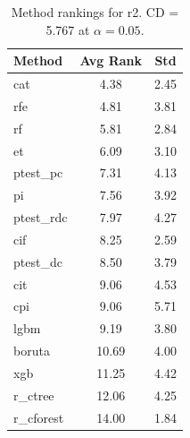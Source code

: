 \begin{table}[h]
\centering
\caption{Method rankings for r2. CD = 5.767 at $\alpha=0.05$.}
\label{tab:ranks_r2}
\begin{tabular}{lcc}
\toprule
Method & Avg Rank & Std \\
\midrule
cat & 4.38 & 2.45 \\
rfe & 4.81 & 3.81 \\
rf & 5.81 & 2.84 \\
et & 6.09 & 3.10 \\
ptest_pc & 7.31 & 4.13 \\
pi & 7.56 & 3.92 \\
ptest_rdc & 7.97 & 4.27 \\
cif & 8.25 & 2.59 \\
ptest_dc & 8.50 & 3.79 \\
cit & 9.06 & 4.53 \\
cpi & 9.06 & 5.71 \\
lgbm & 9.19 & 3.80 \\
boruta & 10.69 & 4.00 \\
xgb & 11.25 & 4.42 \\
r_ctree & 12.06 & 4.25 \\
r_cforest & 14.00 & 1.84 \\
\bottomrule
\end{tabular}
\end{table}